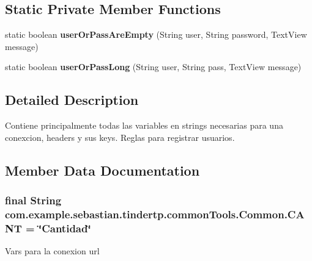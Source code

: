 \subsection*{Static Private Member Functions}
\begin{DoxyCompactItemize}
\item 
static boolean {\bfseries user\+Or\+Pass\+Are\+Empty} (String user, String password, Text\+View message)\hypertarget{classcom_1_1example_1_1sebastian_1_1tindertp_1_1commonTools_1_1Common_a0f2e7e9b432c7fc49695c9f1e752b928}{}\label{classcom_1_1example_1_1sebastian_1_1tindertp_1_1commonTools_1_1Common_a0f2e7e9b432c7fc49695c9f1e752b928}

\item 
static boolean {\bfseries user\+Or\+Pass\+Long} (String user, String pass, Text\+View message)\hypertarget{classcom_1_1example_1_1sebastian_1_1tindertp_1_1commonTools_1_1Common_af14dab85e4017ccb5a702adeb68074b0}{}\label{classcom_1_1example_1_1sebastian_1_1tindertp_1_1commonTools_1_1Common_af14dab85e4017ccb5a702adeb68074b0}

\end{DoxyCompactItemize}


\subsection{Detailed Description}
Contiene principalmente todas las variables en strings necesarias para una conexcion, headers y sus keys. Reglas para registrar usuarios. 

\subsection{Member Data Documentation}
\subsubsection[{\texorpdfstring{C\+A\+NT}{CANT}}]{\setlength{\rightskip}{0pt plus 5cm}final String com.\+example.\+sebastian.\+tindertp.\+common\+Tools.\+Common.\+C\+A\+NT = \char`\"{}Cantidad\char`\"{}\hspace{0.3cm}{\ttfamily [static]}}\hypertarget{classcom_1_1example_1_1sebastian_1_1tindertp_1_1commonTools_1_1Common_a722cf675c0b955610c1909182d9cde13}{}\label{classcom_1_1example_1_1sebastian_1_1tindertp_1_1commonTools_1_1Common_a722cf675c0b955610c1909182d9cde13}
Vars para la conexion url 
